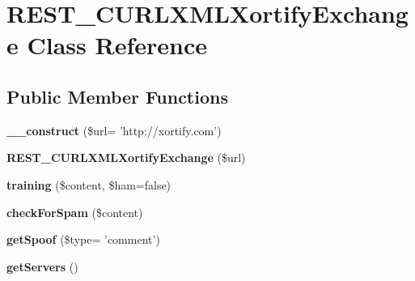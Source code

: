 \hypertarget{class_r_e_s_t___c_u_r_l_x_m_l_xortify_exchange}{\section{R\-E\-S\-T\-\_\-\-C\-U\-R\-L\-X\-M\-L\-Xortify\-Exchange Class Reference}
\label{class_r_e_s_t___c_u_r_l_x_m_l_xortify_exchange}
}
\subsection*{Public Member Functions}
\begin{DoxyCompactItemize}
\item 
\hypertarget{class_r_e_s_t___c_u_r_l_x_m_l_xortify_exchange_aa85539114df60818b95f4a66b47fda1d}{{\bfseries \-\_\-\-\_\-construct} (\$url= 'http\-://xortify.\-com')}\label{class_r_e_s_t___c_u_r_l_x_m_l_xortify_exchange_aa85539114df60818b95f4a66b47fda1d}

\item 
\hypertarget{class_r_e_s_t___c_u_r_l_x_m_l_xortify_exchange_a33b9c383c6fa67796e93ccee8d18bf4a}{{\bfseries R\-E\-S\-T\-\_\-\-C\-U\-R\-L\-X\-M\-L\-Xortify\-Exchange} (\$url)}\label{class_r_e_s_t___c_u_r_l_x_m_l_xortify_exchange_a33b9c383c6fa67796e93ccee8d18bf4a}

\item 
\hypertarget{class_r_e_s_t___c_u_r_l_x_m_l_xortify_exchange_ab1e769ae24c4e8c4d77b43fc33b3fd3a}{{\bfseries training} (\$content, \$ham=false)}\label{class_r_e_s_t___c_u_r_l_x_m_l_xortify_exchange_ab1e769ae24c4e8c4d77b43fc33b3fd3a}

\item 
\hypertarget{class_r_e_s_t___c_u_r_l_x_m_l_xortify_exchange_a65b944c09fe2ae99fcedaa324ed2cd62}{{\bfseries check\-For\-Spam} (\$content)}\label{class_r_e_s_t___c_u_r_l_x_m_l_xortify_exchange_a65b944c09fe2ae99fcedaa324ed2cd62}

\item 
\hypertarget{class_r_e_s_t___c_u_r_l_x_m_l_xortify_exchange_a1d230b269fcaf52cb9ed2ccd05a0d6cf}{{\bfseries get\-Spoof} (\$type= 'comment')}\label{class_r_e_s_t___c_u_r_l_x_m_l_xortify_exchange_a1d230b269fcaf52cb9ed2ccd05a0d6cf}

\item 
\hypertarget{class_r_e_s_t___c_u_r_l_x_m_l_xortify_exchange_a95e839295e03e720d484b90bab96ae5b}{{\bfseries get\-Servers} ()}\label{class_r_e_s_t___c_u_r_l_x_m_l_xortify_exchange_a95e839295e03e720d484b90bab96ae5b}


\end{DoxyCompactItemize}
